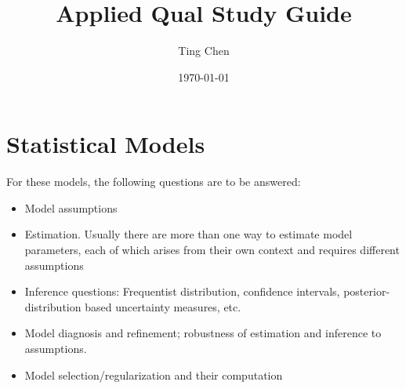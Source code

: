 \documentclass{article}
\title{Applied Qual Study Guide}
\author{Ting Chen}
\date{\today}
\begin{document}
\maketitle

\section{Statistical Models}
For these models, the following questions are to be answered:
\begin{itemize}
  \item Model assumptions
  \item Estimation. Usually there are more than one way to estimate model parameters, each of which arises from their own context and requires different assumptions
  \item Inference questions: Frequentist distribution, confidence intervals, posterior-distribution based uncertainty measures, etc.
  \item Model diagnosis and refinement; robustness of estimation and inference to assumptions.
  \item Model selection/regularization and their computation
\end{itemize}
\end{document}
